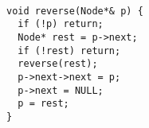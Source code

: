 \begin{verbatim}
               
void reverse(Node*& p) {
  if (!p) return;
  Node* rest = p->next;
  if (!rest) return;
  reverse(rest);
  p->next->next = p;
  p->next = NULL;
  p = rest;
}
\end{verbatim}
